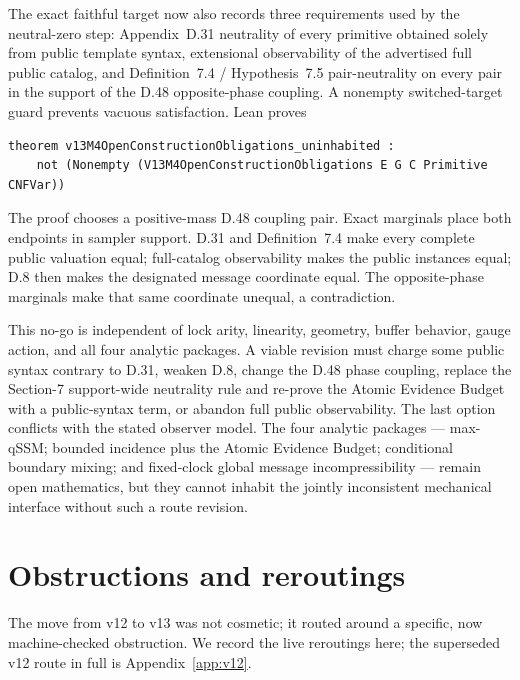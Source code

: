 \documentclass[11pt]{article}
\theoremstyle{definition}
\begin{document}
The exact faithful target now also records three requirements used by the
neutral-zero step: Appendix~D.31 neutrality of every primitive obtained solely
from public template syntax, extensional observability of the advertised full
public catalog, and Definition~7.4 / Hypothesis~7.5 pair-neutrality on every pair
in the support of the D.48 opposite-phase coupling. A nonempty switched-target
guard prevents vacuous satisfaction. Lean proves
\begin{lstlisting}
theorem v13M4OpenConstructionObligations_uninhabited :
    not (Nonempty (V13M4OpenConstructionObligations E G C Primitive CNFVar))
\end{lstlisting}
The proof chooses a positive-mass D.48 coupling pair. Exact marginals place both
endpoints in sampler support. D.31 and Definition~7.4 make every complete public
valuation equal; full-catalog observability makes the public instances equal;
D.8 then makes the designated message coordinate equal. The opposite-phase
marginals make that same coordinate unequal, a contradiction.

This no-go is independent of lock arity, linearity, geometry, buffer behavior,
gauge action, and all four analytic packages. A viable revision must charge some
public syntax contrary to D.31, weaken D.8, change the D.48 phase coupling,
replace the Section-7 support-wide neutrality rule and re-prove the Atomic
Evidence Budget with a public-syntax term, or abandon full public observability.
The last option conflicts with the stated observer model. The four analytic
packages --- max-qSSM; bounded incidence plus the Atomic Evidence Budget;
conditional boundary mixing; and fixed-clock global message incompressibility ---
remain open mathematics, but they cannot inhabit the jointly inconsistent
mechanical interface without such a route revision.

\section{Obstructions and reroutings}
\label{sec:obstructions}

The move from v12 to v13 was not cosmetic; it routed around a specific, now
machine-checked obstruction. We record the live reroutings here; the superseded
v12 route in full is Appendix~\ref{app:v12}.
\end{document}
